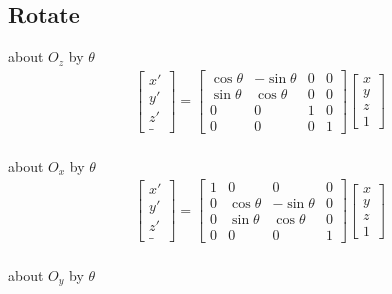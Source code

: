 \documentclass{article}
\begin{document}
\subsection{Rotate}

about $O_z$
by $\theta$
\begin{gather}
		\begin{bmatrix}
		x'\\
		y'\\
		z'\\
		\_
	\end{bmatrix}
	=
	\begin{bmatrix}
		\cos \theta & -\sin \theta & 0 & 0\\
		\sin \theta &  \cos \theta & 0 & 0\\
		0           & 0            & 1 & 0\\
		0           & 0            & 0 & 1
	\end{bmatrix}
	\begin{bmatrix}
		x\\
		y\\
		z\\
		1
	\end{bmatrix}
\end{gather}
\\
about $O_x$
by $\theta$
\begin{gather}
		\begin{bmatrix}
		x'\\
		y'\\
		z'\\
		\_
	\end{bmatrix}
	=
	\begin{bmatrix}
		1 & 0           & 0            & 0\\
		0 & \cos \theta & -\sin \theta & 0\\
		0 & \sin \theta &  \cos \theta & 0\\
		0 & 0           &  0           & 1
	\end{bmatrix}
	\begin{bmatrix}
		x\\
		y\\
		z\\
		1
	\end{bmatrix}
\end{gather}
\\
about $O_y$
by $\theta$
\end{document}
